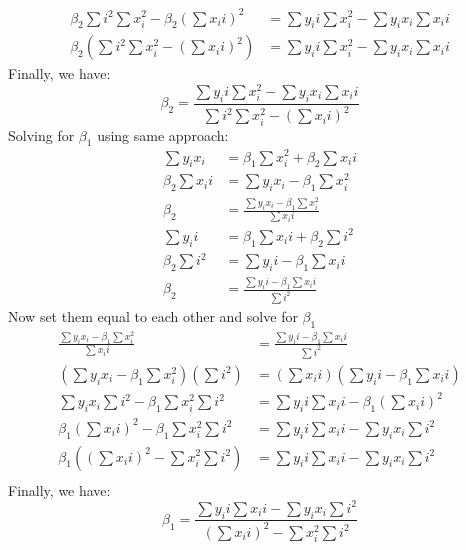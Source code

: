 \documentclass[12pt]{article}
\begin{document}
\begin{enumerate}[1.]
\begin{enumerate}[(a)]
\begin{align*}
                \beta_2\sum  i^2 \sum  x_i^2 - \beta_2 (\sum  x_i i)^2 &= \sum  y_i i \sum  x_i^2 - \sum  y_i x_i \sum  x_i i \\
                \beta_2(\sum  i^2 \sum  x_i^2 - (\sum  x_i i)^2) &= \sum  y_i i \sum  x_i^2 - \sum  y_i x_i \sum  x_i i
            \end{align*}
            Finally, we have:
            \[ \beta_2 = \frac{\sum  y_i i \sum  x_i^2 - \sum  y_i x_i \sum  x_i i}{\sum  i^2 \sum  x_i^2 - (\sum  x_i i)^2}\]
            Solving for $\beta_1$ using same approach:
            \begin{align*}
                \sum  y_i x_i &= \beta_1\sum  x_i^2 + \beta_2\sum  x_i i \\ 
                \beta_2\sum  x_i i &= \sum  y_i x_i - \beta_1\sum  x_i^2 \\ 
                \beta_2 &= \frac{\sum  y_i x_i - \beta_1\sum  x_i^2}{\sum  x_i i} \\ 
                \sum  y_i i &= \beta_1\sum  x_i i + \beta_2\sum  i^2 \\ 
                \beta_2\sum  i^2 &= \sum  y_i i - \beta_1\sum  x_i i \\ 
                \beta_2 &= \frac{\sum  y_i i - \beta_1\sum  x_i i}{\sum  i^2}
            \end{align*}
            Now set them equal to each other and solve for $\beta_1$
            \begin{align*}
                \frac{\sum  y_i x_i - \beta_1\sum  x_i^2}{\sum  x_i i} &= \frac{\sum  y_i i - \beta_1\sum  x_i i}{\sum  i^2} \\
                (\sum  y_i x_i - \beta_1\sum  x_i^2)(\sum  i^2) &= (\sum  x_i i)(\sum  y_i i - \beta_1\sum  x_i i) \\
                \sum  y_i x_i \sum  i^2 - \beta_1\sum  x_i^2\sum  i^2 &= \sum  y_i i\sum  x_i i - \beta_1(\sum  x_i i)^2 \\
                \beta_1(\sum  x_i i)^2  - \beta_1\sum  x_i^2\sum  i^2 &= \sum  y_i i\sum  x_i i - \sum  y_i x_i \sum  i^2 \\
                \beta_1((\sum  x_i i)^2 - \sum  x_i^2\sum  i^2) &= \sum  y_i i\sum  x_i i - \sum  y_i x_i \sum  i^2 \\
            \end{align*}
            Finally, we have:
            \[ \beta_1 = \frac{\sum y_i i\sum x_i i - \sum y_i x_i \sum i^2}{(\sum x_i i)^2 - \sum x_i^2 \sum i^2 }\]


\end{enumerate}
\end{enumerate}
\end{document}
